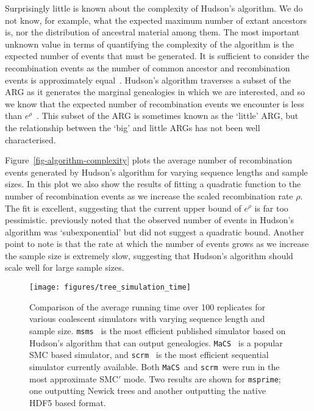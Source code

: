 \documentclass[10pt]{article}
\newcommand{\msms}[0]{\texttt{msms}}
\newcommand{\msprime}[0]{\texttt{msprime}}
\newcommand{\scrm}[0]{\texttt{scrm}}
\newcommand{\MaCS}[0]{\texttt{MaCS}}
\begin{document}
Surprisingly little is known about the complexity of Hudson's algorithm. We do
not know, for example, what the expected maximum number of extant ancestors is,
nor the distribution of ancestral material among them. The most important
unknown value in terms of quantifying the complexity of the algorithm is the
expected number of events that must be generated. It is sufficient to consider
the recombination events as the number of common ancestor and recombination
events is approximately equal~\citep{wh99}. Hudson's algorithm traverses a
subset of the ARG as it generates the marginal genealogies in which we are
interested, and so we know that the expected number of recombination events we
encounter is less than $e^\rho$~\citep{eg90}. This subset of the ARG is
sometimes known as the `little' ARG, but the relationship between the `big' and
little ARGs has not been well characterised.

Figure~\ref{fig-algorithm-complexity} plots the average number of
recombination events generated by Hudson's algorithm for varying sequence
lengths and sample sizes.  In this plot we also show the results of fitting a
quadratic function to the number of recombination events as we increase the
scaled recombination rate $\rho$. The fit is excellent, suggesting that the
current upper bound of $e^\rho$ is far too pessimistic. \citet{wh99} previously
noted that the observed number of events in Hudson's algorithm was
`subexponential' but did not suggest a quadratic bound.  Another point to note is
that the rate at which the number of events grows as we increase the sample
size is extremely slow, suggesting that Hudson's algorithm should scale well
for large sample sizes.

\begin{figure}
    \begin{center}
        \texttt{[image: figures/tree\_simulation\_time]}
    \end{center}
    \caption{\label{fig-tree-simulation-time} Comparison of the average
        running time over 100 replicates for various coalescent simulators
        with varying sequence length and sample size.
        \msms~\citep{eh10} is the most efficient published simulator based on
        Hudson's algorithm that can output genealogies.
        \MaCS~\citep{cmw09} is a popular SMC based simulator, and
        \scrm~\citep{szml14} is the most efficient sequential simulator
        currently available. Both \MaCS\ and \scrm\ were run in the most
        approximate SMC$'$ mode. Two results are shown for \msprime; one
        outputting Newick trees and another outputting the native HDF5 based format.
        }
\end{figure}
\end{document}

